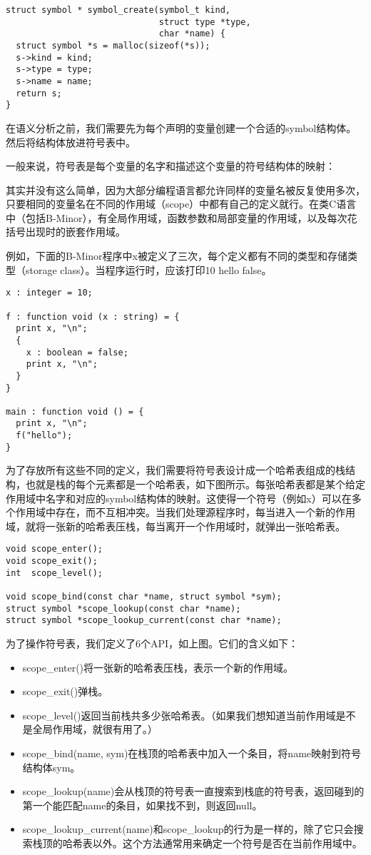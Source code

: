 \documentclass[cn,11pt,chinese]{elegantbook}
\begin{document}
\begin{verbatim}
struct symbol * symbol_create(symbol_t kind,
                              struct type *type,
                              char *name) {
  struct symbol *s = malloc(sizeof(*s));
  s->kind = kind;
  s->type = type;
  s->name = name;
  return s;
}
\end{verbatim}

在语义分析之前，我们需要先为每个声明的变量创建一个合适的symbol结构体。然后将结构体放进符号表中。

一般来说，符号表是每个变量的名字和描述这个变量的符号结构体的映射：

其实并没有这么简单，因为大部分编程语言都允许同样的变量名被反复使用多次，只要相同的变量名在不同的作用域（scope）中都有自己的定义就行。在类C语言中（包括B-Minor），有全局作用域，函数参数和局部变量的作用域，以及每次花括号出现时的嵌套作用域。

例如，下面的B-Minor程序中x被定义了三次，每个定义都有不同的类型和存储类型（storage class）。当程序运行时，应该打印10 hello false。

\begin{verbatim}
x : integer = 10;

f : function void (x : string) = {
  print x, "\n";
  {
    x : boolean = false;
    print x, "\n";
  }
}

main : function void () = {
  print x, "\n";
  f("hello");
}
\end{verbatim}

为了存放所有这些不同的定义，我们需要将符号表设计成一个哈希表组成的栈结构，也就是栈的每个元素都是一个哈希表，如下图所示。每张哈希表都是某个给定作用域中名字和对应的symbol结构体的映射。这使得一个符号（例如x）可以在多个作用域中存在，而不互相冲突。当我们处理源程序时，每当进入一个新的作用域，就将一张新的哈希表压栈，每当离开一个作用域时，就弹出一张哈希表。

\begin{verbatim}
void scope_enter();
void scope_exit();
int  scope_level();

void scope_bind(const char *name, struct symbol *sym);
struct symbol *scope_lookup(const char *name);
struct symbol *scope_lookup_current(const char *name);
\end{verbatim}

为了操作符号表，我们定义了6个API，如上图。它们的含义如下：

\begin{itemize}
  \item scope\_enter()将一张新的哈希表压栈，表示一个新的作用域。
  \item scope\_exit()弹栈。
  \item scope\_level()返回当前栈共多少张哈希表。（如果我们想知道当前作用域是不是全局作用域，就很有用了。）
  \item scope\_bind(name, sym)在栈顶的哈希表中加入一个条目，将name映射到符号结构体sym。
  \item scope\_lookup(name)会从栈顶的符号表一直搜索到栈底的符号表，返回碰到的第一个能匹配name的条目，如果找不到，则返回null。
  \item scope\_lookup\_current(name)和scope\_lookup的行为是一样的，除了它只会搜索栈顶的哈希表以外。这个方法通常用来确定一个符号是否在当前作用域中。
\end{itemize}
\end{document}
